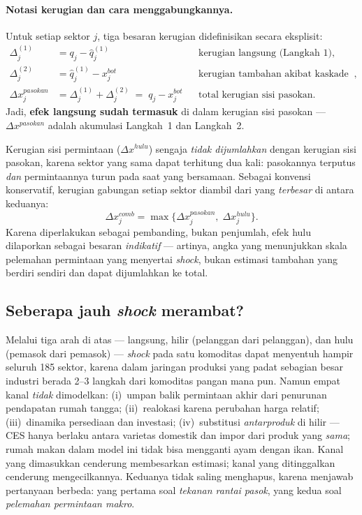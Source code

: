 \documentclass[11pt,a4paper]{article}
\newcommand{\en}[1]{\textit{#1}}   %
\begin{document}
\paragraph{Notasi kerugian dan cara menggabungkannya.} Untuk setiap
sektor $j$, tiga besaran kerugian didefinisikan secara eksplisit:
\begin{align*}
\Delta^{(1)}_j &= q_j - \hat q^{(1)}_j
  && \text{kerugian langsung (Langkah 1)},\\
\Delta^{(2)}_j &= \hat q^{(1)}_j - x^{bot}_j
  && \text{kerugian tambahan akibat kaskade (Langkah 2)},\\
\Delta x^{pasokan}_j &= \Delta^{(1)}_j + \Delta^{(2)}_j
  \;=\; q_j - x^{bot}_j
  && \text{total kerugian sisi pasokan}.
\end{align*}
Jadi, \textbf{efek langsung sudah termasuk} di dalam kerugian sisi
pasokan --- $\Delta x^{pasokan}$ adalah akumulasi Langkah~1 dan
Langkah~2.

Kerugian sisi permintaan ($\Delta x^{hulu}$) sengaja \emph{tidak
dijumlahkan} dengan kerugian sisi pasokan, karena sektor yang sama dapat
terhitung dua kali: pasokannya terputus \emph{dan} permintaannya turun
pada saat yang bersamaan. Sebagai konvensi konservatif, kerugian gabungan
setiap sektor diambil dari yang \emph{terbesar} di antara keduanya:
\begin{equation}
\Delta x^{comb}_j = \max\bigl\{\Delta x^{pasokan}_j,\;
\Delta x^{hulu}_j\bigr\}.
\end{equation}
Karena diperlakukan sebagai pembanding, bukan penjumlah, efek hulu
dilaporkan sebagai besaran \emph{indikatif} --- artinya, angka yang
menunjukkan skala pelemahan permintaan yang menyertai \en{shock}, bukan
estimasi tambahan yang berdiri sendiri dan dapat dijumlahkan ke total.

\subsection{Seberapa jauh \en{shock} merambat?}

Melalui tiga arah di atas --- langsung, hilir (pelanggan dari pelanggan),
dan hulu (pemasok dari pemasok) --- \en{shock} pada satu komoditas dapat
menyentuh hampir seluruh 185 sektor, karena dalam jaringan produksi yang
padat sebagian besar industri berada 2--3 langkah dari komoditas pangan
mana pun. Namun empat kanal \emph{tidak} dimodelkan: (i)~umpan balik
permintaan akhir dari penurunan pendapatan rumah tangga; (ii)~realokasi
karena perubahan harga relatif; (iii)~dinamika persediaan dan investasi;
(iv)~substitusi \emph{antarproduk} di hilir --- CES hanya berlaku antara
varietas domestik dan impor dari produk yang \emph{sama}; rumah makan
dalam model ini tidak bisa mengganti ayam dengan ikan. Kanal yang
dimasukkan cenderung membesarkan estimasi; kanal yang ditinggalkan
cenderung mengecilkannya. Keduanya tidak saling menghapus, karena menjawab
pertanyaan berbeda: yang pertama soal \emph{tekanan rantai pasok}, yang
kedua soal \emph{pelemahan permintaan makro}.
\end{document}
